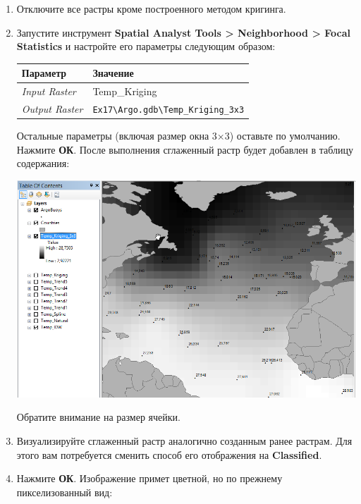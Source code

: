 \documentclass[]{book}
\theoremstyle{definition}
\theoremstyle{definition}
\theoremstyle{definition}
\theoremstyle{remark}
\begin{document}
\begin{enumerate}
\def\labelenumi{\arabic{enumi}.}
\item
  Отключите все растры кроме построенного методом кригинга.
\item
  Запустите инструмент \textbf{Spatial Analyst Tools \textgreater{}
  Neighborhood \textgreater{} Focal Statistics} и настройте его
  параметры следующим образом:

  \begin{longtable}[]{@{}ll@{}}
  \toprule
  Параметр & Значение\tabularnewline
  \midrule
  \endhead
  \emph{Input Raster} & Temp\_Kriging\tabularnewline
  \emph{Output Raster} &
  \texttt{Ex17\textbackslash{}Argo.gdb\textbackslash{}Temp\_Kriging\_3x3}\tabularnewline
  \bottomrule
  \end{longtable}

  Остальные параметры (включая размер окна 3×3) оставьте по умолчанию.
  Нажмите \textbf{ОК}. После выполнения сглаженный растр будет добавлен
  в таблицу содержания:

  \includegraphics{images/Ex17/image13.png}

  Обратите внимание на размер ячейки.
\item
  Визуализируйте сглаженный растр аналогично созданным ранее растрам.
  Для этого вам потребуется сменить способ его отображения на
  \textbf{Classified}.
\item
  Нажмите \textbf{ОК}. Изображение примет цветной, но по прежнему
  пикселизованный вид:


\end{enumerate}
\end{document}
